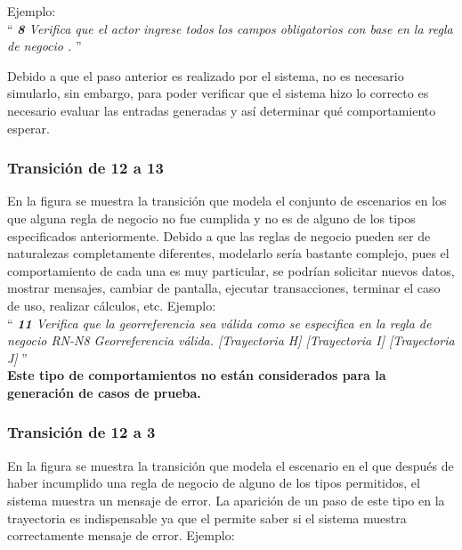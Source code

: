 Ejemplo:\\

 ``{\it
    {\bf 8} \UCsist Verifica que el actor ingrese todos los campos obligatorios con base en la regla de negocio  . 
 }''
	
	Debido a que el paso anterior es realizado por el sistema, no es necesario simularlo, sin embargo, para poder verificar que el sistema hizo lo correcto es necesario evaluar las entradas generadas y así determinar qué comportamiento esperar.
	
\subsubsection{Transición de 12 a 13}
 
En la figura  se muestra la transición que modela el conjunto de escenarios en los que alguna regla de negocio no fue cumplida y no es de alguno de los tipos especificados anteriormente. Debido a que las reglas de negocio pueden ser de naturalezas completamente diferentes, modelarlo sería bastante complejo, pues el comportamiento de cada una es muy particular, se podrían solicitar nuevos datos, mostrar mensajes, cambiar de pantalla, ejecutar transacciones, terminar el caso de uso, realizar cálculos, etc. Ejemplo:\\
	 

	``{\it
	    {\bf 11} \UCsist Verifica que la georreferencia sea válida como se especifica en la regla de negocio RN-N8 Georreferencia válida. [Trayectoria H] [Trayectoria I] [Trayectoria J]
	}''\\
	
		{\bf Este tipo de comportamientos no están considerados para la generación de casos de prueba.}
		
\subsubsection{Transición de 12 a 3} 

En la figura  se muestra la transición que modela el escenario en el que después de haber incumplido una regla de negocio de alguno de los tipos permitidos, el sistema muestra un mensaje de error.
La aparición de un paso de este tipo en la trayectoria es indispensable ya que el  permite saber si el sistema muestra correctamente mensaje de error. Ejemplo: \\

